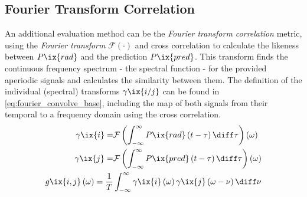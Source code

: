         \subsection{Fourier Transform Correlation}\label{sec:fouriercorrelate}%
%
            An additional evaluation method can be the \textit{Fourier transform correlation} metric, using the \textit{Fourier transform} $\mathcal{F}\left(\cdot\right)$ and cross correlation to calculate the likeness between $P\ix{rad}$ and the prediction $P\ix{pred}$. This transform finds the continuous frequency spectrum - the spectral function - for the provided aperiodic signals and calculates the similarity between them. The definition of the individual (spectral) transforms $\gamma\ix{i/j}$ can be found in \cref{eq:fourier_convolve_base}, including the map of both signals from their temporal to a frequency domain using the cross correlation.%
%
            \begin{align}%
                \begin{split}\label{eq:fourier_convolve_base}%
                    \gamma\ix{i}=&\mathcal{F}\left(\int_{-\infty}^{\infty}P\ix{rad}\left(t-\tau\right)\diff\tau\right)\left(\omega\right)\\%
                    \gamma\ix{j}=&\mathcal{F}\left(\int_{-\infty}^{\infty}P\ix{pred}\left(t-\tau\right)\diff\tau\right)\left(\omega\right)\\%
                    g\ix{i,j}\left(\omega\right)=\frac{1}{T}&\int_{-\infty}^{\infty}\gamma\ix{i}\left(\omega\right)\gamma\ix{j}\left(\omega-\nu\right)\diff\nu%
                \end{split}%
            \end{align}%
%
